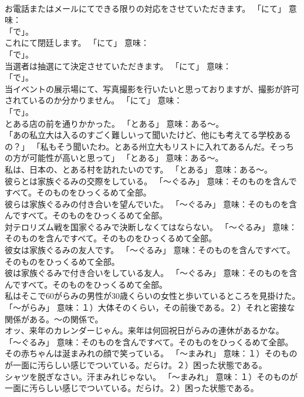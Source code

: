 \documentclass[8pt]{extreport}
\begin{document}
\begin{CJK}{UTF8}{min}
\\	お電話またはメールにてできる限りの対応をさせていただきます。	「にて」 意味：
\\	「で」。	
\\	これにて閉廷します。	「にて」 意味：
\\	「で」。	
\\	当選者は抽選にて決定させていただきます。	「にて」 意味：
\\	「で」。	
\\	当イベントの展示場にて、写真撮影を行いたいと思っておりますが、撮影が許可されているのか分かりません。	「にて」 意味：
\\	「で」。	
\\	とある店の前を通りかかった。	「とある」 意味：ある～。	
\\	「あの私立大は入るのすごく難しいって聞いたけど、他にも考えてる学校あるの？」 「私もそう聞いたわ。とある州立大もリストに入れてあるんだ。そっちの方が可能性が高いと思って」	「とある」 意味：ある～。	
\\	私は、日本の、とある村を訪れたいのです。	「とある」 意味：ある～。	
\\	彼らとは家族ぐるみの交際をしている。	「～ぐるみ」 意味：そのものを含んですべて。そのものをひっくるめて全部。	
\\	彼らは家族ぐるみの付き合いを望んでいた。	「～ぐるみ」 意味：そのものを含んですべて。そのものをひっくるめて全部。	
\\	対テロリズム戦を国家ぐるみで決断しなくてはならない。	「～ぐるみ」 意味：そのものを含んですべて。そのものをひっくるめて全部。	
\\	彼女は家族ぐるみの友人です。	「～ぐるみ」 意味：そのものを含んですべて。そのものをひっくるめて全部。	
\\	彼は家族ぐるみで付き合いをしている友人。	「～ぐるみ」 意味：そのものを含んですべて。そのものをひっくるめて全部。	
\\	私はそこで60がらみの男性が30歳くらいの女性と歩いているところを見掛けた。	「～がらみ」 意味：１）大体そのくらい，その前後である。２）それと密接な関係がある。～の関係で。	
\\	オッ、来年のカレンダーじゃん。来年は何回祝日がらみの連休があるかな。	「～ぐるみ」 意味：そのものを含んですべて。そのものをひっくるめて全部。	
\\	その赤ちゃんは涎まみれの顔で笑っている。	「～まみれ」 意味：１）そのものが一面に汚らしい感じでついている。だらけ。２）困った状態である。	
\\	シャツを脱ぎなさい。汗まみれじゃない。	「～まみれ」 意味：１）そのものが一面に汚らしい感じでついている。だらけ。２）困った状態である。	

\end{CJK}
\end{document}
